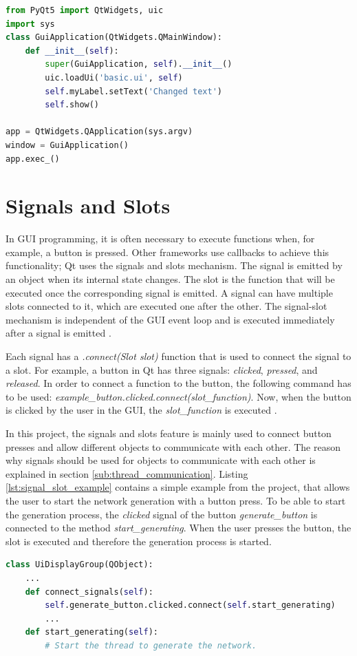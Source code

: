 \begin{lstlisting}[language=python, caption={Simple Qt GUI application}, label={lst:pyqt_gui}]
from PyQt5 import QtWidgets, uic
import sys
class GuiApplication(QtWidgets.QMainWindow):
    def __init__(self):
        super(GuiApplication, self).__init__()
        uic.loadUi('basic.ui', self)
        self.myLabel.setText('Changed text')
        self.show()

app = QtWidgets.QApplication(sys.argv)
window = GuiApplication()
app.exec_()
\end{lstlisting}

\section{Signals and Slots}
\label{sub:signals}

In GUI programming, it is often necessary to execute functions when, for example, a button is pressed. Other frameworks use callbacks to achieve this functionality; Qt uses the signals and slots mechanism. The signal is emitted by an object when its internal state changes. The slot is the function that will be executed once the corresponding signal is emitted. A signal can have multiple slots connected to it, which are executed one after the other. The signal-slot mechanism is independent of the GUI event loop and is executed immediately after a signal is emitted \cite{qt}.

Each signal has a \textit{.connect(Slot slot)} function that is used to connect the signal to a slot. For example, a button in Qt has three signals: \textit{clicked}, \textit{pressed}, and \textit{released}. In order to connect a function to the button, the following command has to be used: \textit{example\_button.clicked.connect(slot\_function)}. Now, when the button is clicked by the user in the GUI, the \textit{slot\_function} is executed \cite{pyqt}.

In this project, the signals and slots feature is mainly used to connect button presses and allow different objects to communicate with each other. The reason why signals should be used for objects to communicate with each other is explained in section \ref{sub:thread_communication}. Listing \ref{lst:signal_slot_example} contains a simple example from the project, that allows the user to start the network generation with a button press. To be able to start the generation process, the \textit{clicked} signal of the button \textit{generate\_button} is connected to the method \textit{start\_generating}. When the user presses the button, the slot is executed and therefore the generation process is started.
\begin{lstlisting}[language=python, caption={Signals and Slots example from the project.}, label={lst:signal_slot_example}]
class UiDisplayGroup(QObject):
    ...
    def connect_signals(self):
        self.generate_button.clicked.connect(self.start_generating)
        ...
    def start_generating(self):
        # Start the thread to generate the network.
\end{lstlisting}

